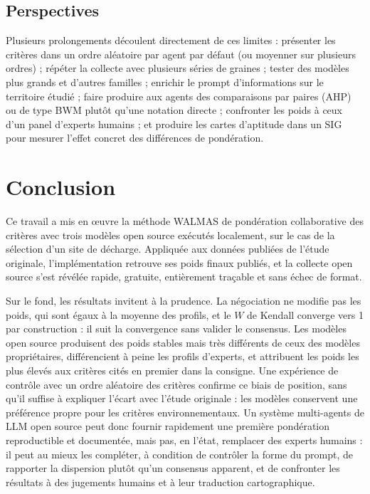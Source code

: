 \documentclass[11pt,a4paper]{article}
\begin{document}
\subsection{Perspectives}

Plusieurs prolongements découlent directement de ces limites : présenter les critères dans un ordre aléatoire par agent par défaut (ou moyenner sur plusieurs ordres) ; répéter la collecte avec plusieurs séries de graines ; tester des modèles plus grands et d'autres familles ; enrichir le prompt d'informations sur le territoire étudié ; faire produire aux agents des comparaisons par paires (AHP) ou de type BWM plutôt qu'une notation directe ; confronter les poids à ceux d'un panel d'experts humains ; et produire les cartes d'aptitude dans un SIG pour mesurer l'effet concret des différences de pondération.

\section{Conclusion}\label{sec:conclusion}

Ce travail a mis en œuvre la méthode WALMAS de pondération collaborative des critères avec trois modèles open source exécutés localement, sur le cas de la sélection d'un site de décharge. Appliquée aux données publiées de l'étude originale, l'implémentation retrouve ses poids finaux publiés, et la collecte open source s'est révélée rapide, gratuite, entièrement traçable et sans échec de format.

Sur le fond, les résultats invitent à la prudence. La négociation ne modifie pas les poids, qui sont égaux à la moyenne des profils, et le $W$ de Kendall converge vers 1 par construction : il suit la convergence sans valider le consensus. Les modèles open source produisent des poids stables mais très différents de ceux des modèles propriétaires, différencient à peine les profils d'experts, et attribuent les poids les plus élevés aux critères cités en premier dans la consigne.
Une expérience de contrôle avec un ordre aléatoire des critères confirme ce biais de position, sans qu'il suffise à expliquer l'écart avec l'étude originale : les modèles conservent une préférence propre pour les critères environnementaux.
Un système multi-agents de LLM open source peut donc fournir rapidement une première pondération reproductible et documentée, mais pas, en l'état, remplacer des experts humains : il peut au mieux les compléter, à condition de contrôler la forme du prompt, de rapporter la dispersion plutôt qu'un consensus apparent, et de confronter les résultats à des jugements humains et à leur traduction cartographique.
\end{document}
